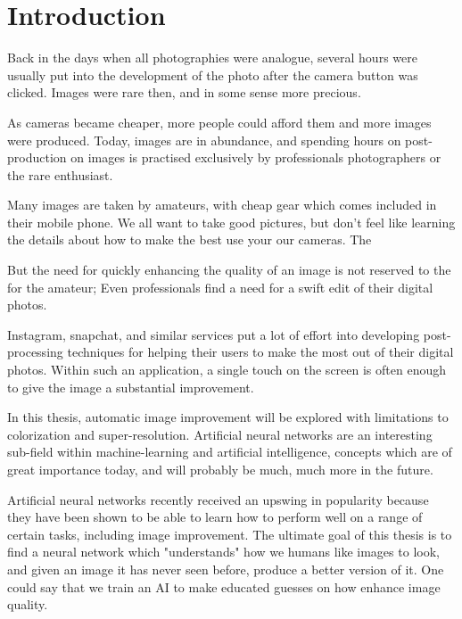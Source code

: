 \chapter{Introduction}\label{cha:intro}
Back in the days when all photographies were analogue, several hours were usually put into the development of the photo after the camera button was clicked. Images were rare then, and in some sense more precious. 

As cameras became cheaper, more people could afford them and more images were produced. Today, images are in abundance, and spending hours on post-production on images is practised exclusively by professionals photographers or the rare enthusiast. 

Many images are taken by amateurs, with cheap gear which comes included in their mobile phone. We all want to take good pictures, but don't feel like learning the details about how to make the best use your our cameras. The 

But the need for quickly enhancing the quality of an image is not reserved to the for the amateur; Even professionals find a need for a swift edit of their digital photos. 

Instagram, snapchat, and similar services put a lot of effort into developing post-processing techniques for helping their users to make the most out of their digital photos. Within such an application, a single touch on the screen is often enough to give the image a substantial improvement. 

In this thesis, automatic image improvement will be explored with limitations to colorization and super-resolution. Artificial neural networks are an interesting sub-field within machine-learning and artificial intelligence, concepts which are of great importance today, and will probably be much, much more in the future. 

Artificial neural networks recently received an upswing in popularity because they have been shown to be able to learn how to perform well on a range of certain tasks, including image improvement. The ultimate goal of this thesis is to find a neural network which "understands" how we humans like images to look, and given an image it has never seen before, produce a better version of it. One could say that we train an AI to make educated guesses on how enhance image quality.

